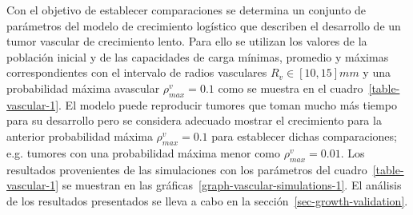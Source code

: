 Con el objetivo de establecer comparaciones se determina un conjunto de par\'ametros del modelo de crecimiento log\'istico que describen el desarrollo de un tumor vascular de crecimiento lento. Para ello se utilizan los valores de la poblaci\'on inicial y de las capacidades de carga m\'inimas, promedio y m\'aximas correspondientes con el intervalo de radios vasculares $R_v \in [10, 15]mm$ y una probabilidad m\'axima avascular $\rho_{max}^v=0$.$1$ como se muestra en el cuadro~\ref{table-vascular-1}. El modelo puede reproducir tumores que toman mucho m\'as tiempo para su desarrollo pero se considera adecuado mostrar el crecimiento para la anterior probabilidad m\'axima $\rho_{max}^v=0$.$1$ para establecer dichas comparaciones; e.g. tumores con una probabilidad m\'axima menor como $\rho_{max}^v=0$.$01$. Los resultados provenientes de las simulaciones con los par\'ametros del cuadro~\ref{table-vascular-1} se muestran en las gr\'aficas~\ref{graph-vascular-simulations-1}. El an\'alisis de los resultados presentados se lleva a cabo en la secci\'on~\ref{sec-growth-validation}.
\begin{table}[!ht]
\begin{center}
\vspace*{-0.6cm}
\end{center}
\caption[Par\'ametros del desarrollo de un carcinoma ductal infiltrante de crecimiento lento durante la etapa vascular]{Par\'ametros del desarrollo de un carcinoma ductal infiltrante de crecimiento lento durante la etapa vascular.}
\label{table-vascular-1}
\end{table}

